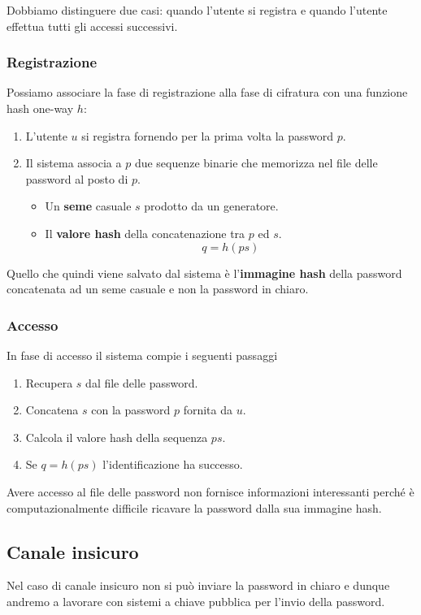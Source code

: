 Dobbiamo distinguere due casi: quando l'utente si registra e quando l'utente effettua tutti gli accessi successivi.

\subsubsection{Registrazione}
Possiamo associare la fase di registrazione alla fase di cifratura con una funzione hash one-way $h$:
\begin{enumerate}
	\item L'utente $u$ si registra fornendo per la prima volta la password $p$.
	\item Il sistema associa a $p$ due sequenze binarie che memorizza nel file delle password al posto di $p$.
	      \begin{itemize}
		      \item Un \textbf{seme} casuale $s$ prodotto da un generatore.
		      \item Il \textbf{valore hash} della concatenazione tra $p$ ed $s$.
		            \[ q = h(p s) \]
	      \end{itemize}
\end{enumerate}
Quello che quindi viene salvato dal sistema \`e l'\textbf{immagine hash} della password concatenata ad un seme casuale
e non la password in chiaro.

\subsubsection{Accesso}
In fase di accesso il sistema compie i seguenti passaggi
\begin{enumerate}
	\item Recupera $s$ dal file delle password.
	\item Concatena $s$ con la password $p$ fornita da $u$.
	\item Calcola il valore hash della sequenza $p s$.
	\item Se $q = h(p s)$ l'identificazione ha successo.
\end{enumerate}
Avere accesso al file delle password non fornisce informazioni interessanti perch\'e \`e computazionalmente difficile
ricavare la password dalla sua immagine hash.

\subsection{Canale insicuro}
Nel caso di canale insicuro non si pu\`o inviare la password in chiaro e dunque andremo a lavorare con sistemi a
chiave pubblica per l'invio della password.

